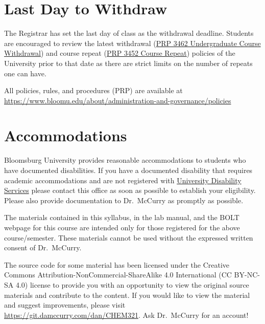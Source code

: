 \documentclass[11pt,letterpaper]{article}
\begin{document}
\section{Last Day to Withdraw}
The Registrar has set the last day of class as the withdrawal deadline.
Students are encouraged to review the latest withdrawal
(\href{https://www.bloomu.edu/prp-3462-undergraduate-course-withdrawal}{PRP 3462 Undergraduate
Course Withdrawal}) and course repeat
(\href{https://www.bloomu.edu/prp-3452-course-repeat}{PRP 3452 Course
Repeat}) policies of the
University prior to that date as there are strict limits on the number of
repeats one can have. 

\begin{mdframed}
	\centering
	All policies, rules, and procedures (PRP) are available at
	\url{https://www.bloomu.edu/about/administration-and-governance/policies}
\end{mdframed}

\section{Accommodations}
Bloomsburg University provides reasonable accommodations to students who have
documented disabilities. If you have a documented disability that requires
academic accommodations and are not registered with 
\href{https://bloomu.prod.acquia-sites.com/offices-directory/disability-services}{University
Disability Services}
please contact this office as soon as possible to establish your
eligibility. Please also provide documentation to Dr.\ McCurry as promptly as
possible.


\vfill

\begin{mdframed}
	\noindent
	The materials contained in this syllabus, in the lab manual, and the
	BOLT webpage for this course are intended only for those registered for
	the above course/semester. These materials cannot be used without the
	expressed written consent of Dr.\ McCurry.

	\noindent
	The source code for some material has been licensed under the Creative
	Commons Attribution-NonCommercial-ShareAlike 4.0 International (CC
	BY-NC-SA 4.0) license to provide you with an opportunity to view the
	original source materials and contribute to the content. If you would
	like to view the material and suggest improvements, please visit
	\url{https://git.damccurry.com/dan/CHEM321}. Ask Dr.\ McCurry for an
	account!
\end{mdframed}
\end{document}
